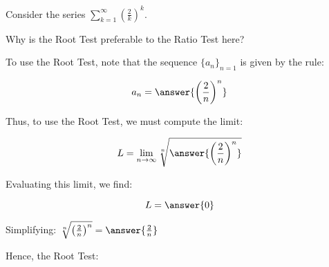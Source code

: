 \documentclass{ximera}
\author{Jim Talamo}
\begin{document}
\begin{exercise}
Consider the series $\sum_{k=1}^{\infty} \left(\frac{2}{k}\right)^k$.

\begin{multipleChoice}
\end{multipleChoice}

Why is the Root Test preferable to the Ratio Test here?
\begin{multipleChoice}
\end{multipleChoice}

To use the Root Test, note that the sequence $\{a_n\}_{n=1}$ is given by the rule:

\[
a_n = \answer{\left(\frac{2}{n}\right)^n}
\]

Thus, to use the Root Test, we must compute the limit:

\[
L = \lim_{n \to \infty} \sqrt[n]{\answer{\left(\frac{2}{n}\right)^n}} 
\]

Evaluating this limit, we find:

\[
L = \answer{0}
\]

\begin{hint}
Simplifying: $ \sqrt[n]{\left(\frac{2}{n}\right)^n} = \answer{ \frac{2}{n}}$
\end{hint}

Hence, the Root Test:
\begin{multipleChoice}
\end{multipleChoice}

\end{exercise}
\end{document}
